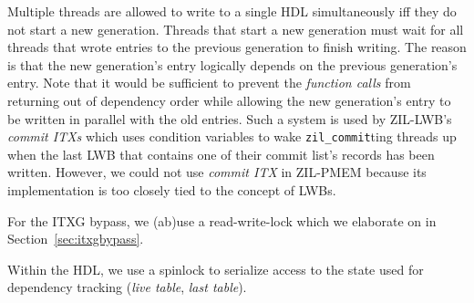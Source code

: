 \documentclass[12pt,a4paper,twoside]{book}
\begin{document}
Multiple threads are allowed to write to a single HDL simultaneously iff they do not start a new generation.
Threads that start a new generation must wait for all threads that wrote entries to the previous generation to finish writing.
The reason is that the new generation's entry logically depends on the previous generation's entry.
Note that it would be sufficient to prevent the \textit{function calls} from returning out of dependency order while allowing the new generation's entry to be written in parallel with the old entries.
Such a system is used by ZIL-LWB's \textit{commit ITXs} which uses condition variables to wake \lstinline{zil_commit}ting threads up when the last LWB that contains one of their commit list's records has been written.
However, we could not use \textit{commit ITX} in ZIL-PMEM because its implementation is too closely tied to the concept of LWBs.

For the ITXG bypass, we (ab)use a read-write-lock which we elaborate on in Section~\ref{sec:itxgbypass}.

Within the HDL, we use a spinlock to serialize access to the state used for dependency tracking (\textit{live table}, \textit{last table}).
\end{document}
